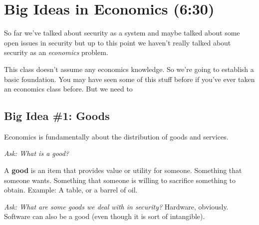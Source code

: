 \documentclass[11pt]{article}
\begin{document}



\section{Big Ideas in Economics (6:30)}

So far we've talked about security as a system and maybe talked about some open issues in security but up to this point we haven't really talked about security as an {\it economics} problem.

This class doesn't assume any economics knowledge. So we're going to establish a basic foundation.
You may have seen some of this stuff before if you've ever taken an economics class before.
But we need to 

\subsection{Big Idea \#1: Goods}

Economics is fundamentally about the distribution of goods and services. 

{\it Ask: What is a good?}

A {\bf good} is an item that provides value or utility for someone. Something that someone wants. Something that someone is willing to sacrifice something to obtain. Example: A table, or a barrel of oil.

{\it Ask: What are some goods we deal with in security?} Hardware, obviously. Software can also be a good (even though it is sort of intangible).
\end{document}
